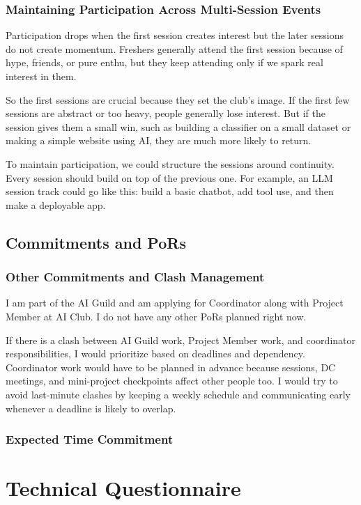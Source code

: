 \documentclass[11pt,a4paper]{article}
\newcommand{\answergap}{\vspace{0.9em}}
\begin{document}
\subsubsection{Maintaining Participation Across Multi-Session Events}
Participation drops when the first session creates interest but the later sessions do not create momentum. Freshers generally attend the first session because of hype, friends, or pure enthu, but they keep attending only if we spark real interest in them.

So the first sessions are crucial because they set the club's image. If the first few sessions are abstract or too heavy, people generally lose interest. But if the session gives them a small win, such as building a classifier on a small dataset or making a simple website using AI, they are much more likely to return.

To maintain participation, we could structure the sessions around continuity. Every session should build on top of the previous one. For example, an LLM session track could go like this: build a basic chatbot, add tool use, and then make a deployable app.

\subsection{Commitments and PoRs}

\subsubsection{Other Commitments and Clash Management}
I am part of the AI Guild and am applying for Coordinator along with Project Member at AI Club. I do not have any other PoRs planned right now.

If there is a clash between AI Guild work, Project Member work, and coordinator responsibilities, I would prioritize based on deadlines and dependency. Coordinator work would have to be planned in advance because sessions, DC meetings, and mini-project checkpoints affect other people too. I would try to avoid last-minute clashes by keeping a weekly schedule and communicating early whenever a deadline is likely to overlap.

\subsubsection{Expected Time Commitment}
\answergap

\section{Technical Questionnaire}
\end{document}
